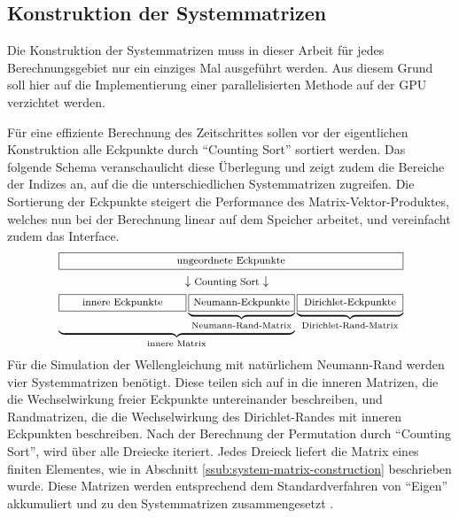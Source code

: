 \documentclass[crop=false,10pt,ngerman]{standalone}
\begin{document}

    \subsection{Konstruktion der Systemmatrizen} %
    \label{sub:konstruktion_der_mass_und_stiffness_matrix}
      Die Konstruktion der Systemmatrizen muss in dieser Arbeit für jedes Berechnungsgebiet nur ein einziges Mal ausgeführt werden.
      Aus diesem Grund soll hier auf die Implementierung einer parallelisierten Methode auf der GPU verzichtet werden.

      Für eine effiziente Berechnung des Zeitschrittes sollen vor der eigentlichen Konstruktion alle Eckpunkte durch \enquote{Counting Sort} sortiert werden.
      Das folgende Schema veranschaulicht diese Überlegung und zeigt zudem die Bereiche der Indizes an, auf die die unterschiedlichen Systemmatrizen zugreifen.
      Die Sortierung der Eckpunkte steigert die Performance des Matrix-Vektor-Produktes, welches nun bei der Berechnung linear auf dem Speicher arbeitet, und vereinfacht zudem das Interface.
      \begin{align*}
        &\,\framebox[0.81\textwidth]{\footnotesize ungeordnete Eckpunkte} \\
        &\makebox[0.81\textwidth]{\hfill $\downarrow \text{\footnotesize Counting Sort} \downarrow$ \hfill}\\
        & \underbrace{\framebox[0.3\textwidth]{\footnotesize innere Eckpunkte}\underbrace{\framebox[0.25\textwidth]{\footnotesize Neumann-Eckpunkte}}_{\text{Neumann-Rand-Matrix}}}_{\text{innere Matrix}} \underbrace{\framebox[0.25\textwidth]{\footnotesize Dirichlet-Eckpunkte}}_{\text{Dirichlet-Rand-Matrix}}
      \end{align*}
      Für die Simulation der Wellengleichung mit natürlichem Neumann-Rand werden vier Systemmatrizen benötigt.
      Diese teilen sich auf in die inneren Matrizen, die die Wechselwirkung freier Eckpunkte untereinander beschreiben, und Randmatrizen, die die Wechselwirkung des Dirichlet-Randes mit inneren Eckpunkten beschreiben.
      Nach der Berechnung der Permutation durch \enquote{Counting Sort}, wird über alle Dreiecke iteriert.
      Jedes Dreieck liefert die Matrix eines finiten Elementes, wie in Abschnitt \ref{ssub:system-matrix-construction} beschrieben wurde.
      Diese Matrizen werden entsprechend dem Standardverfahren von \enquote{Eigen} akkumuliert und zu den Systemmatrizen zusammengesetzt \cite{Eigen2018}.
\end{document}

